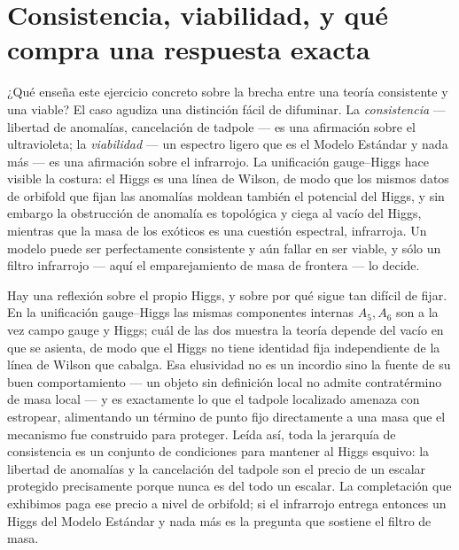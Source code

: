 \documentclass[11pt,a4paper]{article}
\begin{document}
\section{Consistencia, viabilidad, y qu\'e compra una respuesta exacta}\label{sec:reflection}
¿Qu\'e ense\~na este ejercicio concreto sobre la brecha entre una teor\'ia consistente y una
viable? El caso agudiza una distinci\'on f\'acil de difuminar. La \emph{consistencia} ---
libertad de anomal\'ias, cancelaci\'on de tadpole --- es una afirmaci\'on sobre el
ultravioleta; la \emph{viabilidad} --- un espectro ligero que es el Modelo Est\'andar y nada
m\'as --- es una afirmaci\'on sobre el infrarrojo. La unificaci\'on gauge--Higgs hace visible
la costura: el Higgs es una l\'inea de Wilson, de modo que los mismos datos de orbifold que
fijan las anomal\'ias moldean tambi\'en el potencial del Higgs, y sin embargo la obstrucci\'on
de anomal\'ia es topol\'ogica y ciega al vac\'io del Higgs, mientras que la masa de los
ex\'oticos es una cuesti\'on espectral, infrarroja. Un modelo puede ser perfectamente
consistente y a\'un fallar en ser viable, y s\'olo un filtro infrarrojo --- aqu\'i el
emparejamiento de masa de frontera --- lo decide.

Hay una reflexi\'on sobre el propio Higgs, y sobre por qu\'e sigue tan dif\'icil de fijar. En
la unificaci\'on gauge--Higgs las mismas componentes internas $A_5,A_6$ son a la vez campo
gauge y Higgs; cu\'al de las dos muestra la teor\'ia depende del vac\'io en que se asienta, de
modo que el Higgs no tiene identidad fija independiente de la l\'inea de Wilson que cabalga. Esa
elusividad no es un incordio sino la fuente de su buen comportamiento --- un objeto sin
definici\'on local no admite contrat\'ermino de masa local --- y es exactamente lo que el
tadpole localizado amenaza con estropear, alimentando un t\'ermino de punto fijo directamente
a una masa que el mecanismo fue construido para proteger. Le\'ida as\'i, toda la jerarqu\'ia de
consistencia es un conjunto de condiciones para mantener al Higgs esquivo: la libertad de
anomal\'ias y la cancelaci\'on del tadpole son el precio de un escalar protegido precisamente
porque nunca es del todo un escalar. La completaci\'on que exhibimos paga ese precio a nivel de
orbifold; si el infrarrojo entrega entonces un Higgs del Modelo Est\'andar y nada m\'as es la
pregunta que sostiene el filtro de masa.
\end{document}
